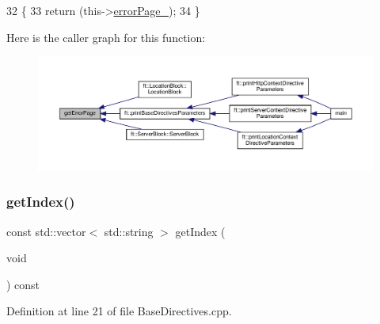 \begin{DoxyCode}
32     \{
33         \textcolor{keywordflow}{return} (this->\hyperlink{classft_1_1_base_directives_a5c0d388109f086503961de84fe3fce90}{errorPage\_});
34     \}
\end{DoxyCode}
Here is the caller graph for this function\+:
\nopagebreak
\begin{figure}[H]
\begin{center}
\leavevmode
\includegraphics[width=350pt]{classft_1_1_base_directives_a3cb0c21f17781de392d5ee09d7190caf_icgraph}
\end{center}
\end{figure}
\mbox{\label{classft_1_1_base_directives_a018f34a5ffd66e891494b5c0ee69177b}} 
\subsubsection{\texorpdfstring{get\+Index()}{getIndex()}}
{\footnotesize\ttfamily const std\+::vector$<$ std\+::string $>$ get\+Index (\begin{DoxyParamCaption}\item[{void}]{ }\end{DoxyParamCaption}) const}



Definition at line 21 of file Base\+Directives.\+cpp.


